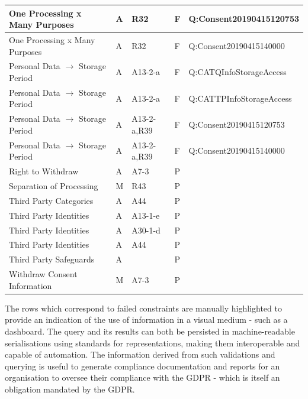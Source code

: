 \begin{center}
\begin{tabularx}{\linewidth}{|l|X|X|X|l|}
\rowcolor{lightred} One Processing x Many Purposes & A & R32 & F & Q:Consent20190415120753 \\ \hline
\rowcolor{lightred} One Processing x Many Purposes & A & R32 & F & Q:Consent20190415140000 \\ \hline
\rowcolor{lightred} Personal Data $\rightarrow$ Storage Period & A & A13-2-a & F & Q:CATQInfoStorageAccess \\ \hline
\rowcolor{lightred} Personal Data $\rightarrow$ Storage Period & A & A13-2-a & F & Q:CATTPInfoStorageAccess \\ \hline
\rowcolor{lightred} Personal Data $\rightarrow$ Storage Period & A & A13-2-a,R39 & F & Q:Consent20190415120753 \\ \hline
\rowcolor{lightred} Personal Data $\rightarrow$ Storage Period & A & A13-2-a,R39 & F & Q:Consent20190415140000 \\ \hline
Right to Withdraw & A & A7-3 & P &  \\ \hline
Separation of Processing & M & R43 & P &  \\ \hline
Third Party Categories & A & A44 & P &  \\ \hline
Third Party Identities & A & A13-1-e & P &  \\ \hline
Third Party Identities & A & A30-1-d & P &  \\ \hline
Third Party Identities & A & A44 & P &  \\ \hline
Third Party Safeguards & A &  & P &  \\ \hline
Withdraw Consent Information & M & A7-3 & P &  \\
\bottomrule
\end{tabularx}
\end{center}

The rows which correspond to failed constraints are manually highlighted to provide an indication of the use of information in a visual medium - such as a dashboard.
The query and its results can both be persisted in machine-readable serialisations using standards for representations, making them interoperable and capable of automation.
The information derived from such validations and querying is useful to generate compliance documentation and reports for an organisation to oversee their compliance with the GDPR - which is itself an obligation mandated by the GDPR.

